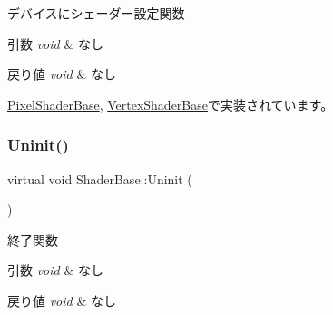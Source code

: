 デバイスにシェーダー設定関数 


\begin{DoxyParams}{引数}
{\em void} & なし \\
\hline
\end{DoxyParams}

\begin{DoxyRetVals}{戻り値}
{\em void} & なし \\
\hline
\end{DoxyRetVals}


\mbox{\hyperlink{class_pixel_shader_base_a6cb7e981ff245b27a30f1943c28f2229}{Pixel\+Shader\+Base}}, \mbox{\hyperlink{class_vertex_shader_base_a72c88a06560f530be7cb04923a916904}{Vertex\+Shader\+Base}}で実装されています。

\mbox{\label{class_shader_base_a784edfa81bec4d08a257ed4f02c61222}} 
\subsubsection{\texorpdfstring{Uninit()}{Uninit()}}
{\footnotesize\ttfamily virtual void Shader\+Base\+::\+Uninit (\begin{DoxyParamCaption}{ }\end{DoxyParamCaption})\hspace{0.3cm}{\ttfamily [pure virtual]}}



終了関数 


\begin{DoxyParams}{引数}
{\em void} & なし \\
\hline
\end{DoxyParams}

\begin{DoxyRetVals}{戻り値}
{\em void} & なし \\
\hline
\end{DoxyRetVals}


